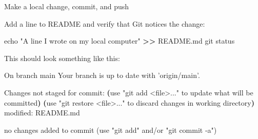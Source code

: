 \documentclass[
  ignorenonframetext,
]{beamer}
\newenvironment{Shaded}{\begin{snugshade}}{\end{snugshade}}
\newcommand{\BuiltInTok}[1]{#1}
\newcommand{\ExtensionTok}[1]{#1}
\newcommand{\FunctionTok}[1]{\textcolor[rgb]{0.00,0.00,0.00}{#1}}
\newcommand{\KeywordTok}[1]{\textcolor[rgb]{0.13,0.29,0.53}{\textbf{#1}}}
\newcommand{\NormalTok}[1]{#1}
\newcommand{\OperatorTok}[1]{\textcolor[rgb]{0.81,0.36,0.00}{\textbf{#1}}}
\newcommand{\StringTok}[1]{\textcolor[rgb]{0.31,0.60,0.02}{#1}}
\begin{document}
\begin{frame}[fragile]{Make a local change, commit, and push}
\protect\hypertarget{make-a-local-change-commit-and-push}{}

Add a line to README and verify that Git notices the change:

\begin{Shaded}
\begin{Highlighting}[]
\BuiltInTok{echo} \StringTok{"A line I wrote on my local computer"} \OperatorTok{>>}\NormalTok{ README.md}
\FunctionTok{git}\NormalTok{ status}
\end{Highlighting}
\end{Shaded}

This should look something like this:

\begin{Shaded}
\begin{Highlighting}[]
\ExtensionTok{On}\NormalTok{ branch main}
\ExtensionTok{Your}\NormalTok{ branch is up to date with }\StringTok{'origin/main'}\NormalTok{.}

\ExtensionTok{Changes}\NormalTok{ not staged for commit:}
  \KeywordTok{(}\ExtensionTok{use} \StringTok{"git add <file>..."}\NormalTok{ to update what will be committed}\KeywordTok{)}
  \KeywordTok{(}\ExtensionTok{use} \StringTok{"git restore <file>..."}\NormalTok{ to discard changes in working directory}\KeywordTok{)}
        \ExtensionTok{modified}\NormalTok{:   README.md}

\ExtensionTok{no}\NormalTok{ changes added to commit (use }\StringTok{"git add"}\NormalTok{ and/or }\StringTok{"git commit -a"}\NormalTok{)}
\end{Highlighting}
\end{Shaded}

\end{frame}
\end{document}
